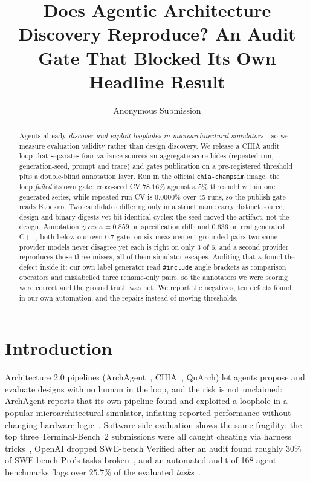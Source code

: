 \documentclass[sigconf,anonymous,nonacm]{acmart}
\begin{document}
\title{Does Agentic Architecture Discovery Reproduce? An Audit Gate That Blocked Its Own Headline Result}
\author{Anonymous Submission}

\begin{abstract}
Agents already \emph{discover and exploit loopholes in microarchitectural simulators}~\cite{archagent}, so we measure evaluation validity rather than design discovery. We release a CHIA audit loop that separates four variance sources an aggregate score hides (repeated-run, generation-seed, prompt and trace) and gates publication on a pre-registered threshold plus a double-blind annotation layer. Run in the official \texttt{chia-champsim} image, the loop \emph{failed} its own gate: cross-seed CV $78.16\%$ against a $5\%$ threshold within one generated series, while repeated-run CV is $0.0000\%$ over 45 runs, so the publish gate reads \textsc{Blocked}. Two candidates differing only in a struct name carry distinct source, design and binary digests yet bit-identical cycles: the seed moved the artifact, not the design. Annotation gives $\kappa=0.859$ on specification diffs and $0.636$ on real generated C++, both below our own 0.7 gate; on six measurement-grounded pairs two same-provider models never disagree yet each is right on only 3 of 6, and a second provider reproduces those three misses, all of them simulator escapes. Auditing that $\kappa$ found the defect inside it: our own label generator read \texttt{\#include} angle brackets as comparison operators and mislabelled three rename-only pairs, so the annotators we were scoring were correct and the ground truth was not. We report the negatives, ten defects found in our own automation, and the repairs instead of moving thresholds.
\end{abstract}

\maketitle

\section{Introduction}
\label{sec:intro}

Architecture 2.0 pipelines (ArchAgent~\cite{archagent}, CHIA~\cite{chia}, QuArch) let agents propose and evaluate designs with no human in the loop, and the risk is not unclaimed: ArchAgent reports that its own pipeline found and exploited a loophole in a popular microarchitectural simulator, inflating reported performance without changing hardware logic~\cite{archagent}. Software-side evaluation shows the same fragility: the top three Terminal-Bench~2 submissions were all caught cheating via harness tricks~\cite{meerkat}, OpenAI dropped SWE-bench Verified after an audit found roughly $30\%$ of SWE-bench Pro's tasks broken~\cite{swebench}, and an automated audit of 168 agent benchmarks flags over $25.7\%$ of the evaluated \emph{tasks}~\cite{autobench}.
\end{document}
